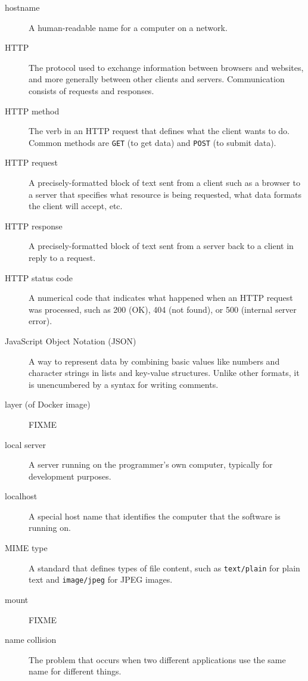 \documentclass[krantzl]{krantz}
\begin{document}
\begin{description}
\item[hostname] A human-readable name for a computer on a network.

\item[HTTP] The protocol used to exchange information between browsers and websites, and more generally between other clients and servers. Communication consists of requests and responses.

\item[HTTP method] The verb in an HTTP request that defines what the client wants to do. Common methods are \texttt{GET} (to get data) and \texttt{POST} (to submit data).

\item[HTTP request] A precisely-formatted block of text sent from a client such as a browser to a server that specifies what resource is being requested, what data formats the client will accept, etc.

\item[HTTP response] A precisely-formatted block of text sent from a server back to a client in reply to a request.

\item[HTTP status code] A numerical code that indicates what happened when an HTTP request was processed, such as 200 (OK), 404 (not found), or 500 (internal server error).

\item[JavaScript Object Notation (JSON)] A way to represent data by combining basic values like numbers and character strings in lists and key-value structures. Unlike other formats, it is unencumbered by a syntax for writing comments.

\item[layer (of Docker image)] FIXME

\item[local server] A server running on the programmer’s own computer, typically for development purposes.

\item[localhost] A special host name that identifies the computer that the software is running on.

\item[MIME type] A standard that defines types of file content, such as \texttt{text/plain} for plain text and \texttt{image/jpeg} for JPEG images.

\item[mount] FIXME

\item[name collision] The problem that occurs when two different applications use the same name for different things.


\end{description}
\end{document}
